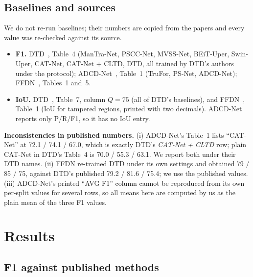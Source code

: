 \documentclass[11pt,a4paper]{article}
\begin{document}
\subsection{Baselines and sources}
We do not re-run baselines; their numbers are copied from the papers and every value was
re-checked against its source.
\begin{itemize}
  \item \textbf{F1.} DTD~\cite{dtd}, Table~4 (ManTra-Net, PSCC-Net, MVSS-Net, BEiT-Uper,
        Swin-Uper, CAT-Net, CAT-Net + CLTD, DTD, all trained by DTD's authors under the
        protocol); ADCD-Net~\cite{adcd}, Table~1 (TruFor, PS-Net, ADCD-Net); FFDN~\cite{ffdn},
        Tables~1 and~5.
  \item \textbf{IoU.} DTD~\cite{dtd}, Table~7, column $Q=75$ (all of DTD's baselines), and
        FFDN~\cite{ffdn}, Table~1 (IoU for tampered regions, printed with two decimals).
        ADCD-Net reports only P/R/F1, so it has no IoU entry.
\end{itemize}
\noindent\textbf{Inconsistencies in published numbers.} (i) ADCD-Net's Table~1 lists ``CAT-Net''
at 72.1 / 74.1 / 67.0, which is exactly DTD's \emph{CAT-Net + CLTD} row; plain CAT-Net in DTD's
Table~4 is 70.0 / 55.3 / 63.1. We report both under their DTD names. (ii) FFDN re-trained DTD
under its own settings and obtained 79 / 85 / 75, against DTD's published 79.2 / 81.6 / 75.4; we
use the published values. (iii) ADCD-Net's printed ``AVG F1'' column cannot be reproduced from its
own per-split values for several rows, so all means here are computed by us as the plain mean of
the three F1 values.

\section{Results}\label{sec:results}

\subsection{F1 against published methods}
\end{document}
